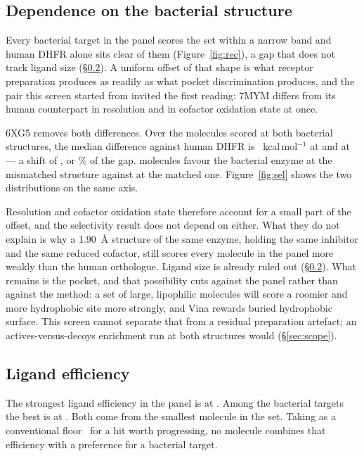 \documentclass[11pt,a4paper]{article}
\begin{document}
\subsection{Dependence on the bacterial structure}
\label{sec:offset}

Every bacterial target in the panel scores the set within a narrow band and
human DHFR alone sits clear of them (Figure~\ref{fig:rec}), a gap that does
not track ligand size (\S\ref{sec:le}). A uniform offset of that shape is
what receptor preparation produces as readily as what pocket discrimination
produces, and the pair this screen started from invited the first reading:
7MYM differs from its human counterpart in resolution and in cofactor
oxidation state at once.

6XG5 removes both differences. Over the \nDhfrCommon{} molecules scored at
both bacterial structures, the median difference against human DHFR is
\offsetControlMedian{}~kcal\,mol$^{-1}$ at \offsetControl{} and
\offsetPrimaryMedian{} at \bactDhfr{} --- a shift of \offsetShift{}, or
\offsetPct\% of the gap. \offsetControlN{} molecules favour the bacterial
enzyme at the mismatched structure against \offsetPrimaryN{} at the matched
one. Figure~\ref{fig:sel} shows the two distributions on the same axis.

Resolution and cofactor oxidation state therefore account for a small part of
the offset, and the selectivity result does not depend on either. What they do
not explain is why a 1.90~\AA{} structure of the same enzyme, holding the same
inhibitor and the same reduced cofactor, still scores every molecule in the
panel more weakly than the human orthologue. Ligand size is already ruled out
(\S\ref{sec:le}). What remains is the pocket, and that possibility cuts
against the panel rather than against the method: a set of large, lipophilic
molecules will score a roomier and more hydrophobic site more strongly, and
Vina rewards buried hydrophobic surface. This screen cannot separate that from
a residual preparation artefact; an actives-versus-decoys enrichment run at
both structures would (\S\ref{sec:scope}).

\subsection{Ligand efficiency}
\label{sec:le}

The strongest ligand efficiency in the panel is \leBest{} at
\leBestTarget. Among the bacterial targets the best is \leBestBacterial{} at
\leBestBacterialTarget. Both come from the smallest molecule in the set.
Taking \leFloor{} as a conventional floor~\cite{hopkins2004} for a hit
worth progressing, no
molecule combines that efficiency with a preference for a bacterial target.
\end{document}
